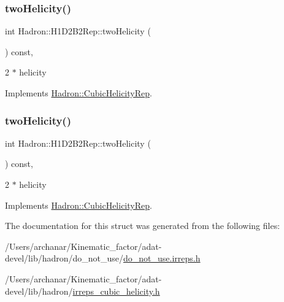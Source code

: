 \subsubsection{\texorpdfstring{twoHelicity()}{twoHelicity()}\hspace{0.1cm}{\footnotesize\ttfamily [2/3]}}
{\footnotesize\ttfamily int Hadron\+::\+H1\+D2\+B2\+Rep\+::two\+Helicity (\begin{DoxyParamCaption}{ }\end{DoxyParamCaption}) const\hspace{0.3cm}{\ttfamily [inline]}, {\ttfamily [virtual]}}

2 $\ast$ helicity 

Implements \mbox{\hyperlink{structHadron_1_1CubicHelicityRep_af507aa56fc2747eacc8cb6c96db31ecc}{Hadron\+::\+Cubic\+Helicity\+Rep}}.

\mbox{\label{structHadron_1_1H1D2B2Rep_ac30c0bcd58285d8b5786f2fbfe58ffa2}} 
\subsubsection{\texorpdfstring{twoHelicity()}{twoHelicity()}\hspace{0.1cm}{\footnotesize\ttfamily [3/3]}}
{\footnotesize\ttfamily int Hadron\+::\+H1\+D2\+B2\+Rep\+::two\+Helicity (\begin{DoxyParamCaption}{ }\end{DoxyParamCaption}) const\hspace{0.3cm}{\ttfamily [inline]}, {\ttfamily [virtual]}}

2 $\ast$ helicity 

Implements \mbox{\hyperlink{structHadron_1_1CubicHelicityRep_af507aa56fc2747eacc8cb6c96db31ecc}{Hadron\+::\+Cubic\+Helicity\+Rep}}.



The documentation for this struct was generated from the following files\+:\begin{DoxyCompactItemize}
\item 
/\+Users/archanar/\+Kinematic\+\_\+factor/adat-\/devel/lib/hadron/do\+\_\+not\+\_\+use/\mbox{\hyperlink{adat-devel_2lib_2hadron_2do__not__use_2do__not__use_8irreps_8h}{do\+\_\+not\+\_\+use.\+irreps.\+h}}\item 
/\+Users/archanar/\+Kinematic\+\_\+factor/adat-\/devel/lib/hadron/\mbox{\hyperlink{adat-devel_2lib_2hadron_2irreps__cubic__helicity_8h}{irreps\+\_\+cubic\+\_\+helicity.\+h}}\end{DoxyCompactItemize}
